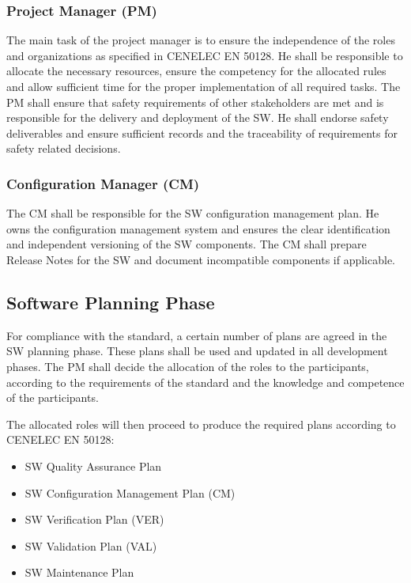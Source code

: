 \subsubsection{Project Manager (PM)}
\label{sec:project-manager}

The main task of the project manager is to ensure the independence of the roles
and organizations as specified in CENELEC EN 50128. He shall be responsible to
allocate the necessary resources, ensure the competency for the allocated rules
and allow sufficient time for the proper implementation of all required
tasks. The PM shall ensure that safety requirements of other stakeholders are
met and is responsible for the delivery and deployment of the SW. He shall
endorse safety deliverables and ensure sufficient records and the traceability
of requirements for safety related decisions.

\subsubsection{Configuration Manager (CM)}
\label{sec:conf-manag}

The CM shall be responsible for the SW configuration management plan. He owns
the configuration management system and ensures the clear identification and
independent versioning of the SW components. The CM shall prepare Release Notes
for the SW and document incompatible components if applicable.

\subsection{Software Planning Phase}
\label{sec:documents--plan}

For compliance with the standard, a certain number of plans are agreed in the SW
planning phase. These plans shall be used and updated in all development
phases. The PM shall decide the allocation of the roles to the participants,
according to the requirements of the standard and the knowledge and competence
of the participants.

The allocated roles will then proceed to produce the required plans according to
CENELEC EN 50128:

\begin{itemize}
\item SW Quality Assurance Plan
\item SW Configuration Management Plan (CM)
\item SW Verification Plan (VER)
\item SW Validation Plan (VAL)
\item SW Maintenance Plan
\end{itemize}


